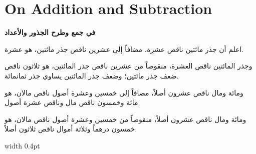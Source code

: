 \documentclass[11pt,a4paper]{book}
\begin{document}
\newpage

\chapter{On Addition and Subtraction}
\label{ch:addition}

\noindent\begin{minipage}[t]{0.48\textwidth}
\raggedleft

\begin{Arabic}
\textbf{في جمع وطرح الجذور والأعداد}

اعلم أن جذر مائتين ناقص عشرة، مضافاً إلى عشرين ناقص جذر مائتين، هو عشرة.

وجذر المائتين ناقص العشرة، منقوصاً من عشرين ناقص جذر المائتين، هو ثلاثون ناقص ضعف جذر مائتين؛ وضعف جذر المائتين يساوي جذر ثمانمائة.

ومائة ومال ناقص عشرون أصلاً، مضافاً إلى خمسين وعشرة أصول ناقص مالان، هو مائة وخمسون ناقص مال وناقص عشرة أصول.

ومائة ومال ناقص عشرون أصلاً، منقوصاً من خمسين وعشرة أصول ناقص مالان، هو خمسون درهماً وثلاثة أموال ناقص ثلاثون أصلاً.
\end{Arabic}

\end{minipage}%
\hfill\vrule width 0.4pt\hfill
\end{document}

